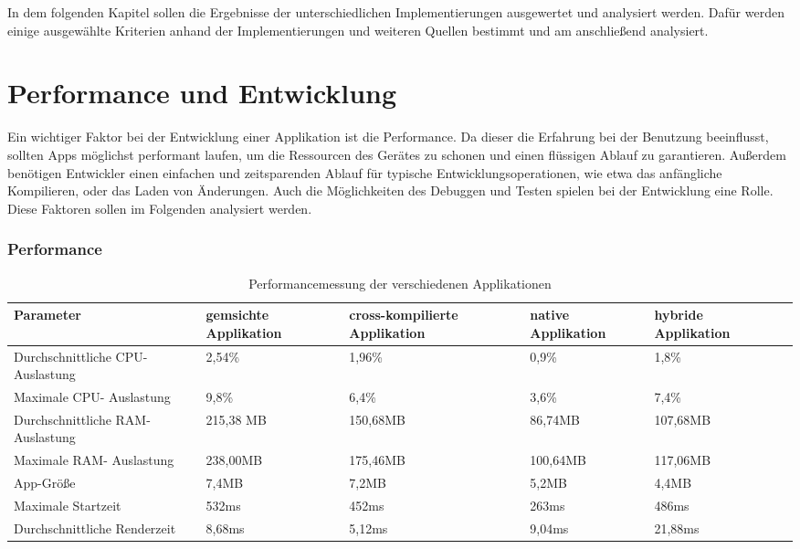 In dem folgenden Kapitel sollen die Ergebnisse der unterschiedlichen Implementierungen ausgewertet und analysiert werden. Dafür werden einige ausgewählte Kriterien anhand der Implementierungen und weiteren Quellen bestimmt und am anschließend analysiert.

\section{Performance und Entwicklung}
Ein wichtiger Faktor bei der Entwicklung einer Applikation ist die Performance. Da dieser die Erfahrung bei der Benutzung beeinflusst, sollten Apps möglichst performant laufen, um die Ressourcen des Gerätes zu schonen und einen flüssigen Ablauf zu garantieren. Außerdem benötigen Entwickler einen einfachen und zeitsparenden Ablauf für typische Entwicklungsoperationen, wie etwa das anfängliche Kompilieren, oder das Laden von Änderungen. Auch die Möglichkeiten des Debuggen und Testen spielen bei der Entwicklung eine Rolle. Diese Faktoren sollen im Folgenden analysiert werden.

\subsubsection{Performance}

\begin{table}[ht]
\centering
\caption{Performancemessung der verschiedenen Applikationen}
\begin{tabular}{ |p{4cm}||p{3cm}|p{2.5cm}|p{2.5cm}|p{2.5cm}|p{2.5cm}| }
 \hline
 Parameter & gemsichte Applikation & cross-kompilierte Applikation & native Applikation & hybride Applikation \\
 \hline
 Durchschnittliche CPU-Auslastung       &   2,54\%&   1,96\%& 0,9\%& 1,8\%\\
  \hline
 Maximale CPU- Auslastung  & 9,8\%& 6,4\%& 3,6\%& 7,4\%\\
  \hline
 Durchschnittliche RAM-Auslastung & 215,38 MB& 150,68MB& 86,74MB& 107,68MB\\
  \hline
 Maximale RAM- Auslastung & 238,00MB& 175,46MB& 100,64MB& 117,06MB\\
  \hline
 App-Größe & 7,4MB& 7,2MB& 5,2MB& 4,4MB\\
  \hline
 Maximale Startzeit & 532ms& 452ms& 263ms& 486ms\\
 \hline
 Durchschnittliche Renderzeit &8,68ms& 5,12ms& 9,04ms& 21,88ms\\
 \hline
\end{tabular}
\label{tab:evaluations_performance}
\end{table}

